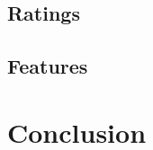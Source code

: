 \documentclass[conference]{IEEEtran}
\begin{document}
\subsection{Ratings}


\subsection{Features}




\section{Conclusion}






\end{document}
